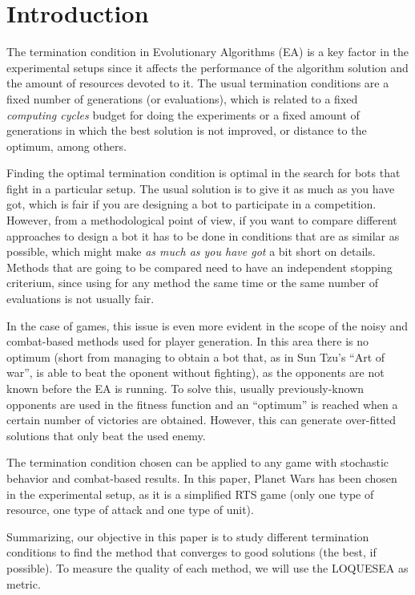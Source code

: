\documentclass[runningheads,a4paper]{llncs}
\begin{document}
\section{Introduction}

The termination condition in Evolutionary Algorithms (EA) is a key
factor in the experimental setups since it affects the performance of
the algorithm solution and the amount of resources devoted to it. The
usual termination conditions are a fixed number of generations (or
evaluations), which is related to a fixed {\em computing cycles}
budget for doing the experiments or a fixed amount of generations in
which the best solution is not improved, or distance to the optimum,
among others.

Finding the optimal termination condition is optimal in the search for
bots that fight in a particular setup. The usual solution is to give
it as much as you have got, which is fair if you are designing a bot
to participate in a competition. However, from a methodological point
of view, if you want to compare different approaches to design a bot
it has to be done in conditions that are as similar as possible, which
might make {\em as much as you have got} a bit short on
details. Methods that are going to be compared need to have an
independent stopping criterium, since using for any method the same
time or the same number of evaluations is not usually fair. 
 
In the case of games, this issue is even more evident in the scope of
the noisy and combat-based methods used for player generation. In this
area there is no optimum (short from managing to obtain a bot that, as
in Sun Tzu's ``Art of war'', is able to beat the oponent without
fighting), as the opponents are not known before the EA is running. To
solve this, usually previously-known opponents are used in the fitness
function and an ``optimum'' is reached when a certain number of
victories are obtained. However, this can generate over-fitted
solutions that only beat the used enemy. %



The termination condition chosen can be applied to any game with
stochastic behavior and combat-based results. In this paper, Planet
Wars has been chosen in the experimental setup, as it is a simplified
RTS game (only one type of resource, one type of attack and one type
of unit).

Summarizing, our objective in this paper is to study different 
termination conditions to find the method that converges to good 
solutions (the best, if possible). To measure the quality of each 
method, we will use the LOQUESEA as metric.
\end{document}
